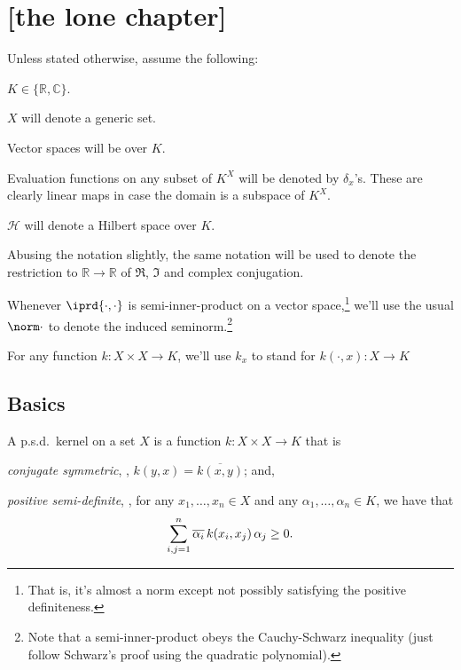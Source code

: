 \chapter{[the lone chapter]}

\begin{conv}
	Unless stated otherwise, assume the following:
	\begin{assmplist}
		\item $K\in\{\mathbb R, \mathbb C\}$.
		
		\item $X$ will denote a generic set.
		
		\item Vector spaces will be over $K$.
		
		\item Evaluation functions on any subset of $K^X$ will be denoted by $\delta_x$'s. These are clearly linear maps in case the domain is a subspace of $K^X$.
		
		\item $\mathscr H$ will denote a Hilbert space over $K$.
		
		\item Abusing the notation slightly, the same notation will be used to denote the restriction to $\mathbb{R\to R}$ of $\Re$, $\Im$ and complex conjugation.
		
		\item Whenever $\iprd{\cdot, \cdot}$ is semi-inner-product on a vector space,\footnote{
			That is, it's almost a norm except not possibly satisfying the positive definiteness.
		} we'll use the usual $\norm\cdot$ to denote the induced seminorm.\footnote{Note that a semi-inner-product obeys the Cauchy-Schwarz inequality (just follow Schwarz's proof using the quadratic polynomial).}
		
		\item For any function $k\colon X\times X\to K$, we'll use $k_x$ to stand for $k(\cdot, x)\colon X\to K$
	\end{assmplist}
\end{conv}

\section{Basics}

	\begin{dfn}
		A p.s.d.\ kernel on a set $X$ is a function $k\colon X\times X\to K$ that is
		\begin{mylist}
			\item \emph{conjugate symmetric}, \ie, $k(y, x) = \overline{k(x, y)}$; and,
			
			\item \emph{positive semi-definite}, \ie, for any $x_1, \ldots, x_n\in X$ and any $\alpha_1, \ldots, \alpha_n\in K$, we have that
			\[
			\sum_{i, j = 1}^n \overline{\alpha_i}\, k(x_i, x_j)\, \alpha_j\ge 0\text.
			\]
		\end{mylist}
	\end{dfn}
	
